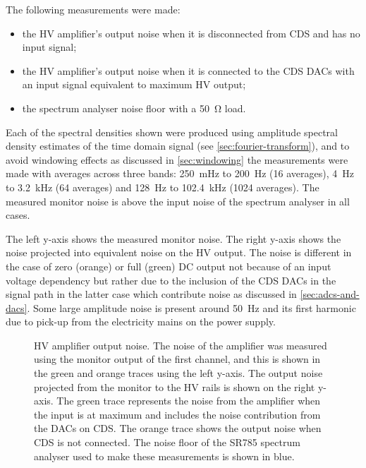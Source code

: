 The following measurements were made:
\begin{itemize}
  \item the \gls{HV} amplifier's output noise when it is disconnected from \gls{CDS} and has no input signal;
  \item the \gls{HV} amplifier's output noise when it is connected to the \gls{CDS} \glspl{DAC} with an input signal equivalent to maximum \gls{HV} output;
  \item the spectrum analyser noise floor with a \SI{50}{\ohm} load.
\end{itemize}
Each of the spectral densities shown were produced using amplitude spectral density estimates of the time domain signal (see \cref{sec:fourier-transform}), and to avoid windowing effects as discussed in \cref{sec:windowing} the measurements were made with averages across three bands: \SI{250}{\milli\hertz} to \SI{200}{\hertz} (\num{16} averages), \SI{4}{\hertz} to \SI{3.2}{\kilo\hertz} (\num{64} averages) and \SI{128}{\hertz} to \SI{102.4}{\kilo\hertz} (\num{1024} averages). The measured monitor noise is above the input noise of the spectrum analyser in all cases.

The left y-axis shows the measured monitor noise. The right y-axis shows the noise projected into equivalent noise on the \gls{HV} output. The noise is different in the case of zero (orange) or full (green) \gls{DC} output not because of an input voltage dependency but rather due to the inclusion of the \gls{CDS} \glspl{DAC} in the signal path in the latter case which contribute noise as discussed in \cref{sec:adcs-and-dacs}. Some large amplitude noise is present around \SI{50}{\hertz} and its first harmonic due to pick-up from the electricity mains on the power supply.

\begin{figure}
  \centering
  
  \caption[High voltage amplifier output noise]{\gls{HV} amplifier output noise. The noise of the amplifier was measured using the monitor output of the first channel, and this is shown in the green and orange traces using the left y-axis. The output noise projected from the monitor to the \gls{HV} rails is shown on the right y-axis. The green trace represents the noise from the amplifier when the input is at maximum and includes the noise contribution from the \glspl{DAC} on \gls{CDS}. The orange trace shows the output noise when \gls{CDS} is not connected. The noise floor of the SR785 spectrum analyser used to make these measurements is shown in blue.}
  \label{fig:hv-amp-output-noise}
\end{figure}

